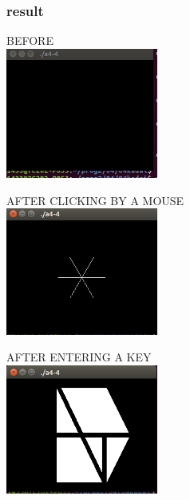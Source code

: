 \documentclass[10pt,a4paper]{jsarticle}
\begin{document}
\subsubsection{result}
\noindent BEFORE\\
\includegraphics[width=5cm]{before.png}

\noindent AFTER CLICKING BY A MOUSE\\
\includegraphics[width=5cm]{mouse.png}


\noindent AFTER ENTERING A KEY\\
\includegraphics[width=5cm]{key.png}
\end{document}
